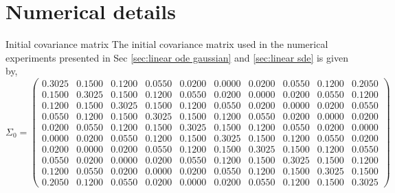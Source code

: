 \documentclass[11pt, a4paper, oneside, reqno]{amsart}
\makeatletter
\def\subsection{\@startsection{subsection}{2}%
	\z@{.5\linespacing\@plus.7\linespacing}{.5\linespacing}%
	{\normalfont\large\bfseries}}
\makeatother
\begin{document}
\section{Numerical details}\label{app:numerical details}
\subsection{Initial covariance matrix}
\noindent The initial covariance matrix used in the numerical experiments presented in Sec \ref{sec:linear ode gaussian} and \ref{sec:linear sde} is given by,
\[
\Sigma_0 =
\begin{pmatrix}
0.3025 & 0.1500 & 0.1200 & 0.0550 & 0.0200 & 0.0000 & 0.0200 & 0.0550 & 0.1200 & 0.2050 \\
0.1500 & 0.3025 & 0.1500 & 0.1200 & 0.0550 & 0.0200 & 0.0000 & 0.0200 & 0.0550 & 0.1200 \\
0.1200 & 0.1500 & 0.3025 & 0.1500 & 0.1200 & 0.0550 & 0.0200 & 0.0000 & 0.0200 & 0.0550 \\
0.0550 & 0.1200 & 0.1500 & 0.3025 & 0.1500 & 0.1200 & 0.0550 & 0.0200 & 0.0000 & 0.0200 \\
0.0200 & 0.0550 & 0.1200 & 0.1500 & 0.3025 & 0.1500 & 0.1200 & 0.0550 & 0.0200 & 0.0000 \\
0.0000 & 0.0200 & 0.0550 & 0.1200 & 0.1500 & 0.3025 & 0.1500 & 0.1200 & 0.0550 & 0.0200 \\
0.0200 & 0.0000 & 0.0200 & 0.0550 & 0.1200 & 0.1500 & 0.3025 & 0.1500 & 0.1200 & 0.0550 \\
0.0550 & 0.0200 & 0.0000 & 0.0200 & 0.0550 & 0.1200 & 0.1500 & 0.3025 & 0.1500 & 0.1200 \\
0.1200 & 0.0550 & 0.0200 & 0.0000 & 0.0200 & 0.0550 & 0.1200 & 0.1500 & 0.3025 & 0.1500 \\
0.2050 & 0.1200 & 0.0550 & 0.0200 & 0.0000 & 0.0200 & 0.0550 & 0.1200 & 0.1500 & 0.3025
\end{pmatrix}
\]
\end{document}
